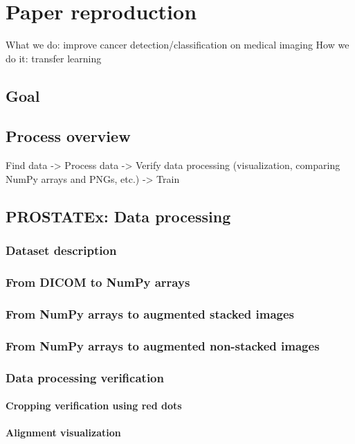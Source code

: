 
\chapter{Paper reproduction}
\label{ch:paper_reproduction}

What we do: improve cancer detection/classification on medical imaging
How we do it: transfer learning

\section{Goal}

\section{Process overview}

Find data -> Process data -> Verify data processing (visualization, comparing NumPy arrays and PNGs, etc.) -> Train 

\section{PROSTATEx: Data processing}
\subsection{Dataset description}
\subsection{From DICOM to NumPy arrays}
\subsection{From NumPy arrays to augmented stacked images}
\subsection{From NumPy arrays to augmented non-stacked images}
\subsection{Data processing verification}
\subsubsection{Cropping verification using red dots}
\subsubsection{Alignment visualization}

